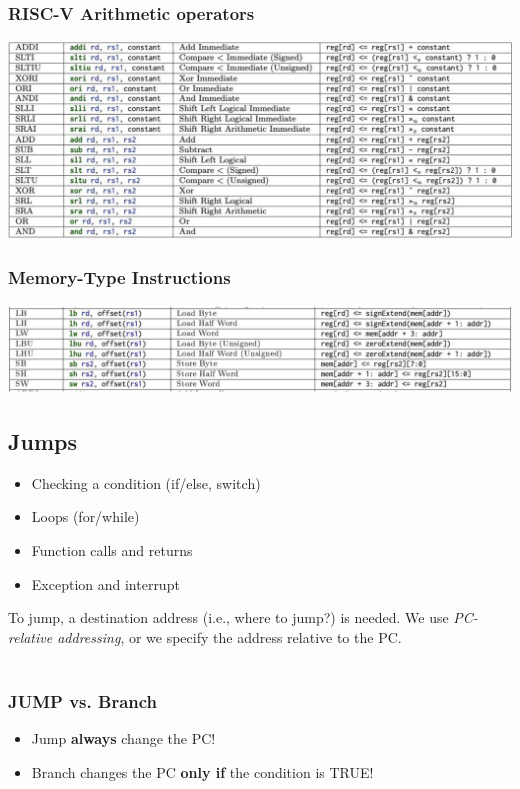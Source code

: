 \documentclass[10pt]{article}
\begin{document}
\subsubsection*{RISC-V Arithmetic operators}
\begin{center}
\includegraphics*[scale=0.4]{W1_4.png}
\end{center}
\subsubsection*{Memory-Type Instructions}
\begin{center}
\includegraphics*[scale=0.47]{W1_5.png}
\end{center}
\subsection*{Jumps}
\begin{itemize}
    \item Checking a condition (if/else, switch)
    \item Loops (for/while)
    \item Function calls and returns
    \item Exception and interrupt
\end{itemize}
To jump, a destination address (i.e., where to jump?) is needed.  We use \textit{PC-relative addressing}, or we specify the address relative to the PC.\\\\
\subsubsection*{JUMP vs. Branch}
\begin{itemize}
    \item Jump \textbf{always} change the PC!
    \item Branch changes the PC \textbf{only if} the condition is TRUE!
\end{itemize}
\end{document}
